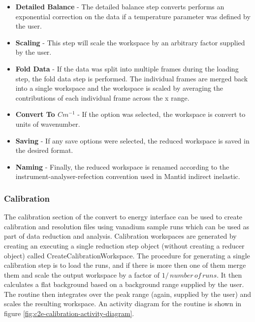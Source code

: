 \documentclass[paper=a4, fontsize=11pt]{scrartcl}	%
\numberwithin{equation}{section}															%
\numberwithin{figure}{section}																%
\numberwithin{table}{section}																%
\begin{document}
\begin{itemize}
\item \textbf{Detailed Balance} - The detailed balance step converts performs an exponential correction on the data if a temperature parameter was defined by the user.

\item \textbf{Scaling} - This step will scale the workspace by an arbitrary factor supplied by the user.

\item \textbf{Fold Data} - If the data was split into multiple frames during the loading step, the fold data step is performed. The individual frames are merged back into a single workspace and the workspace is scaled by averaging the contributions of each individual frame across the x range.

\item \textbf{Convert To $Cm^{-1}$} - If the option was selected, the workspace is convert to units of wavenumber.

\item \textbf{Saving} - If any save options were selected, the reduced workspace is saved in the desired format.
\item \textbf{Naming} - Finally, the reduced workspace is renamed according to the instrument-analyser-refection convention used in Mantid indirect inelastic.
\end{itemize}

\subsubsection{Calibration}
The calibration section of the convert to energy interface can be used to create calibration and resolution files using vanadium sample runs which can be used as part of data reduction and analysis. Calibration workspaces are generated by creating an executing a single reduction step object  (without creating a reducer object) called CreateCalibrationWorkspace. The procedure for generating a single calibration step is to load the runs, and if there is more then one of them merge them and scale the output workspace by a factor of $1/\,number\,of\,runs$. It then calculates a flat background based on a background range supplied by the user. The routine then integrates over the peak range (again, supplied by the user) and scales the resulting workspace. An activity diagram for the routine is shown in figure \ref{fig:c2e-calibration-activity-diagram}.
\end{document}
